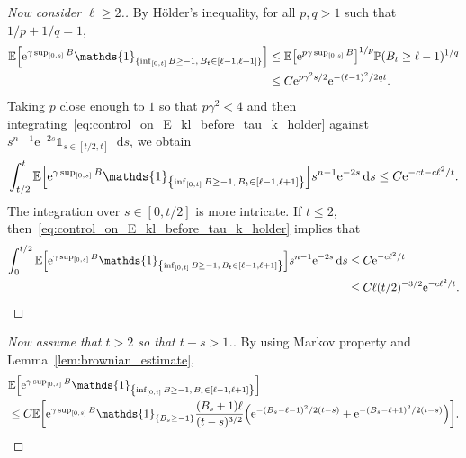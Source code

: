 \documentclass[AHL,Unicode,longabstracts,published]{cedram}
\newcommand{\e}{\mathrm{e}}
\renewcommand{\d}[1]{\mathop{}\!\mathrm{d}#1}
\newcommand{\E}{\mathbb{E}}
\renewcommand{\P}{\mathbb{P}}
\newcommand\1{\mathds{1}}
\let\originalleft\left
\let\originalright\right
\renewcommand{\left}{\mathopen{}\mathclose\bgroup\originalleft}
\renewcommand{\right}{\aftergroup\egroup\originalright}
\begin{document}
\begin{proofc}
\begin{proof}[{Now consider $\ell \geq 2$.}]
By H\"older's inequality, for all $p, q > 1$ such that $1/p + 1/q = 1$,
\begin{equation}\label{eq:control_on_E_kl_before_tau_k_holder}
\begin{aligned}[t]
\E \left[\e^{\gamma \sup_{[0, s]} B} \1_{\{\inf_{[0, t]} B \geq -1,\, B_t \in [\ell-1, \ell+1]\}} \right] &\leq \E \left[\e^{p \gamma \sup_{[0, s]} B} \right]^{1/p} \P(B_t \geq \ell - 1)^{1/q} \\
& \leq C \e^{p \gamma^2 s/2} \e^{-(\ell - 1)^2/2qt}.
\end{aligned}
\end{equation}
Taking $p$ close enough to $1$ so that $p\gamma^2 < 4$ and then integrating~\eqref{eq:control_on_E_kl_before_tau_k_holder} against $s^{n-1} \e^{-2s} \1_{s \in [t/2, t]} \d{s}$, we obtain
\begin{equation}
\label{eq:control_on_E_kl_before_tau_k_large_s_2}
\int_{t/2}^t \E \left[\e^{\gamma \sup_{[0, s]} B} \1_{\left\{\inf_{[0, t]} B \geq -1,\, B_t \in [\ell-1, \ell+1]\right\}} \right] s^{n-1} \e^{-2s} \d{s} \leq C \e^{-c t - c \ell^2/t}.
\end{equation}
The integration over $s \in [0, t/2]$ is more intricate. If $t \leq 2$, then~\eqref{eq:control_on_E_kl_before_tau_k_holder} implies that
\begin{equation}\label{eq:control_on_E_kl_before_tau_k_small_s_small_t}
\begin{aligned}[t]
\int_0^{t/2} \E \left[\e^{\gamma \sup_{[0, s]} B} \1_{\left\{\inf_{[0, t]} B \geq -1,\, B_t \in [\ell-1, \ell+1]\right\}} \right] s^{n-1} \e^{-2s} \d{s} & \leq C \e^{-c\ell^2/t} \\
& \leq C \ell (t/2)^{-3/2} \e^{-c\ell^2/t}.
\end{aligned}
\end{equation}
\let\qed\relax
\end{proof}
\begin{proof}[{Now assume that $t > 2$ so that $t - s > 1$.}]
By using Markov property and Lemma~\ref{lem:brownian_estimate},
\begin{equation}
\begin{aligned}[t]
&\E \left[\e^{\gamma \sup_{[0, s]} B} \1_{\left\{\inf_{[0, t]} B \geq -1,\, B_t \in [\ell-1, \ell+1]\right\}} \right]\\
&\leq C \E \left[\e^{\gamma \sup_{[0, s]} B} \1_{\left\{B_s \geq -1\right\}} \frac{(B_s + 1) \ell}{(t - s)^{3/2}} \left(\e^{-(B_s - \ell - 1)^2/2(t-s)} + \e^{-(B_s - \ell + 1)^2/2(t-s)}\right) \right].

\end{aligned}
\end{equation}
\end{proof}
\end{proofc}
\end{document}
